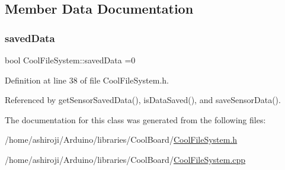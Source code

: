 \subsection{Member Data Documentation}
\mbox{\label{classCoolFileSystem_ad398e0c5c41a0c88acdf5d672aa71351}} 
\subsubsection{\texorpdfstring{saved\+Data}{savedData}}
{\footnotesize\ttfamily bool Cool\+File\+System\+::saved\+Data =0\hspace{0.3cm}{\ttfamily [private]}}



Definition at line 38 of file Cool\+File\+System.\+h.



Referenced by get\+Sensor\+Saved\+Data(), is\+Data\+Saved(), and save\+Sensor\+Data().



The documentation for this class was generated from the following files\+:\begin{DoxyCompactItemize}
\item 
/home/ashiroji/\+Arduino/libraries/\+Cool\+Board/\hyperlink{CoolFileSystem_8h}{Cool\+File\+System.\+h}\item 
/home/ashiroji/\+Arduino/libraries/\+Cool\+Board/\hyperlink{CoolFileSystem_8cpp}{Cool\+File\+System.\+cpp}\end{DoxyCompactItemize}
